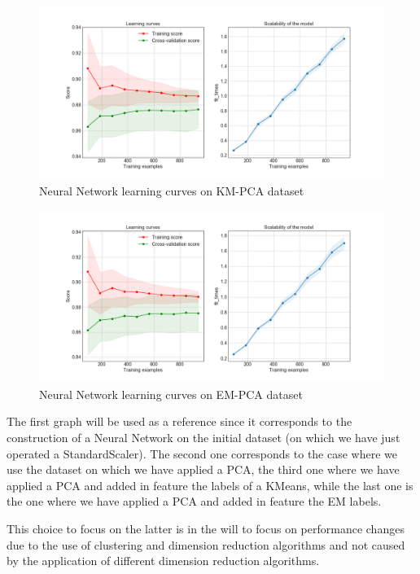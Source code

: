 \documentclass[15pt]{article}
\begin{document}
\begin{multicols}{2}
\begin{figure}[H]
\centering
\includegraphics[width = \columnwidth]{NNCkmpca.png}
\caption{Neural Network learning curves on KM-PCA dataset}
\end{figure}

\begin{figure}[H]
\centering
\includegraphics[width = \columnwidth]{NNCgmpca.png}
\caption{Neural Network learning curves on EM-PCA dataset}
\end{figure}

The first graph will be used as a reference since it corresponds to the construction of a Neural Network on the initial dataset (on which we have just operated a StandardScaler). The second one corresponds to the case where we use the dataset on which we have applied a PCA, the third one where we have applied a PCA and added in feature the labels of a KMeans, while the last one is the one where we have applied a PCA and added in feature the EM labels. 

This choice to focus on the latter is in the will to focus on performance changes due to the use of clustering and dimension reduction algorithms and not caused by the application of different dimension reduction algorithms.


\end{multicols}
\end{document}

